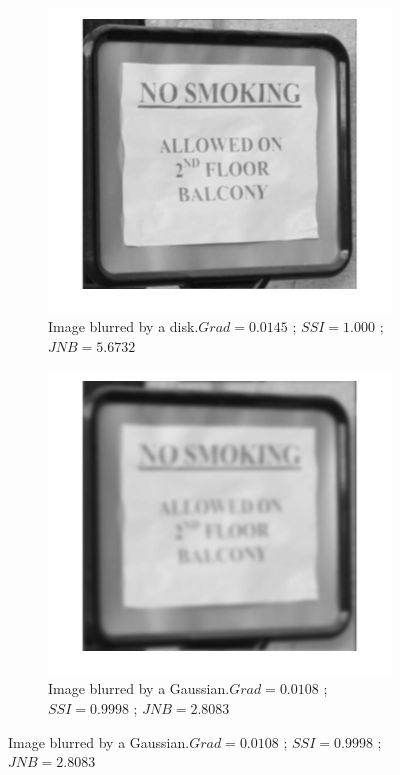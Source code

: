 \begin{figure}[h!]
\begin{subfigure}[b]{0.35\textwidth}
        \end{subfigure}
        \hspace{.6cm}
        \begin{subfigure}[b]{0.35\textwidth}
                 \centering
                 \includegraphics[width=\textwidth]{sign_D.jpg}
                 \caption{Image blurred by a disk.\newline $Grad=0.0145$ ; $SSI=1.000$ ; $JNB=5.6732$}
                       
        \end{subfigure}
        \hspace{.6cm}
        \begin{subfigure}[b]{0.35\textwidth}
                \centering
                \includegraphics[width=\textwidth]{sign_G.jpg}
                \caption{Image blurred by a Gaussian.\newline $Grad=0.0108$ ; $SSI=0.9998$ ; $JNB=2.8083$} 
        \end{subfigure} 
       

\end{figure}
